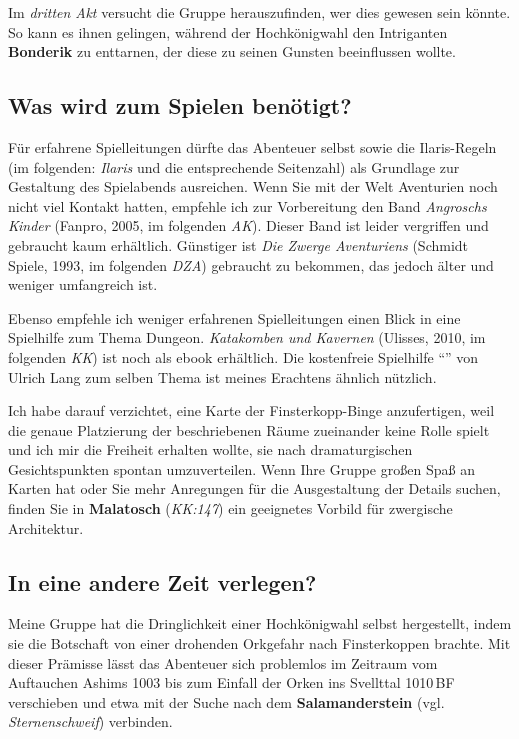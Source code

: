 Im \emph{dritten Akt} versucht die Gruppe herauszufinden, wer dies gewesen sein könnte.
So kann es ihnen gelingen, während der Hochkönigwahl den Intriganten \textbf{Bonderik} zu enttarnen,
der diese zu seinen Gunsten beeinflussen wollte.

\subsection{Was wird zum Spielen benötigt?}
Für erfahrene Spielleitungen dürfte das Abenteuer selbst sowie die Ilaris-Regeln (im folgenden: \emph{Ilaris} und die entsprechende Seitenzahl) als Grundlage zur Gestaltung des Spielabends ausreichen.
Wenn Sie mit der Welt Aventurien noch nicht viel Kontakt hatten, empfehle ich zur Vorbereitung den Band \emph{Angroschs Kinder} (Fanpro, 2005, im folgenden \emph{AK}).
Dieser Band ist leider vergriffen und gebraucht kaum erhältlich.
Günstiger ist \emph{Die Zwerge Aventuriens} (Schmidt Spiele, 1993, im folgenden \emph{DZA}) gebraucht zu bekommen,
das jedoch älter und weniger umfangreich ist.

Ebenso empfehle ich weniger erfahrenen Spielleitungen einen Blick in eine Spielhilfe zum Thema Dungeon.
\emph{Katakomben und Kavernen} (Ulisses, 2010, im folgenden \emph{KK})
ist noch als ebook erhältlich.
Die kostenfreie Spielhilfe \enquote{} von Ulrich Lang
zum selben Thema ist meines Erachtens ähnlich nützlich.

Ich habe darauf verzichtet, eine Karte der Finsterkopp-Binge anzufertigen, weil die genaue Platzierung der beschriebenen Räume zueinander keine Rolle spielt und ich mir die Freiheit erhalten wollte, sie nach dramaturgischen Gesichtspunkten spontan umzuverteilen. Wenn Ihre Gruppe großen Spaß an Karten hat oder Sie mehr Anregungen für die Ausgestaltung der Details suchen,
finden Sie in \textbf{Malatosch} (\emph{KK:147}) ein geeignetes Vorbild für zwergische Architektur.

\subsection{In eine andere Zeit verlegen?}
Meine Gruppe hat die Dringlichkeit einer Hochkönigwahl selbst hergestellt, indem sie die Botschaft von einer drohenden Orkgefahr nach Finsterkoppen brachte.
Mit dieser Prämisse lässt das Abenteuer sich problemlos im Zeitraum vom Auftauchen Ashims 1003 bis zum Einfall der Orken ins Svellttal 1010\,BF verschieben
und etwa mit der Suche nach dem  \textbf{Salamanderstein} (vgl. \emph{Sternenschweif}) verbinden.

